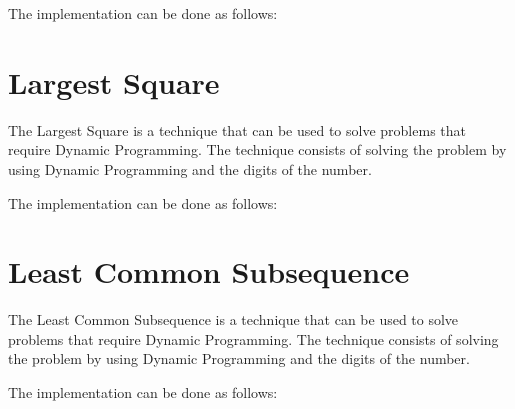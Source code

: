 The implementation can be done as follows:



\section{Largest Square}

The Largest Square is a technique that can be used to solve problems that require Dynamic Programming. The technique consists of solving the problem by using Dynamic Programming and the digits of the number.

The implementation can be done as follows:



\section{Least Common Subsequence}

The Least Common Subsequence is a technique that can be used to solve problems that require Dynamic Programming. The technique consists of solving the problem by using Dynamic Programming and the digits of the number.

The implementation can be done as follows:



